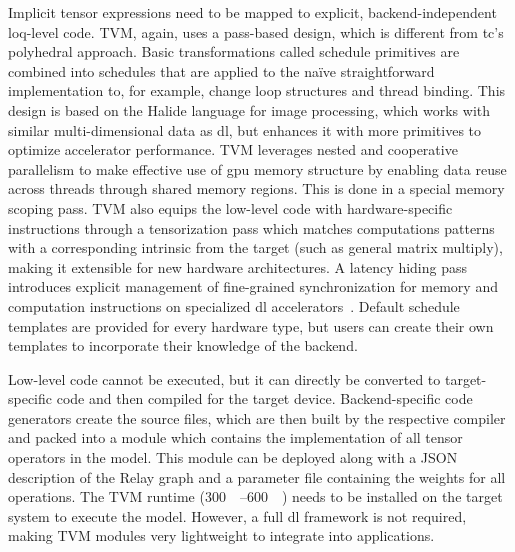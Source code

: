 Implicit tensor expressions need to be mapped to explicit, backend-independent loq-level code. TVM, again, uses a pass-based design, which is different from \gls{tc}'s polyhedral approach. Basic transformations called schedule primitives are combined into schedules that are applied to the naïve straightforward implementation to, for example, change loop structures and thread binding. This design is based on the Halide language for image processing, which works with similar multi-dimensional data as \gls{dl}, but enhances it with more primitives to optimize accelerator performance. TVM leverages nested and cooperative parallelism to make effective use of \gls{gpu} memory structure by enabling data reuse across threads through shared memory regions. This is done in a special memory scoping pass. TVM also equips the low-level code with hardware-specific instructions through a tensorization pass which matches computations patterns with a corresponding intrinsic from the target (such as general matrix multiply), making it extensible for new hardware architectures. A latency hiding pass introduces explicit management of fine-grained synchronization for memory and computation instructions on specialized \gls{dl} accelerators~\cite[p.~5~f.]{Chen.2018b}. Default schedule templates are provided for every hardware type, but users can create their own templates to incorporate their knowledge of the backend.

Low-level code cannot be executed, but it can directly be converted to target-specific code and then compiled for the target device. Backend-specific code generators create the source files, which are then built by the respective compiler and packed into a module which contains the implementation of all tensor operators in the model. This module can be deployed along with a JSON description of the Relay graph and a parameter file containing the weights for all operations. The TVM runtime (\SIrange{300}{600}{\kilo\byte}) needs to be installed on the target system to execute the model. However, a full \gls{dl} framework is not required, making TVM modules very lightweight to integrate into applications.

